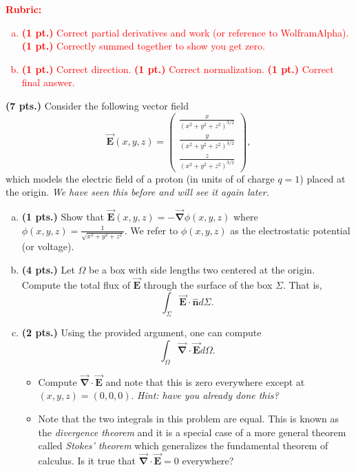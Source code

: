 \documentclass[12pt]{article} %
\newcommand{\grad}{\boldsymbol{\vec{\nabla}}}
\newcommand{\vecfieldE}{\boldsymbol{\vec{E}}}
\newcommand{\unitvec}{\boldsymbol{\hat{n}}}
\begin{document}
\vspace*{1cm}
\textcolor{red}{
\noindent \textbf{Rubric:}
\begin{enumerate}[(a)]
    \item \textbf{(1 pt.)} Correct partial derivatives and work (or reference to WolframAlpha). \textbf{(1 pt.)} Correctly summed together to show you get zero.
    \item \textbf{(1 pt.)} Correct direction. \textbf{(1 pt.)} Correct normalization. \textbf{(1 pt.)} Correct final answer.
\end{enumerate}
}



\newpage
\begin{problem}
\textbf{(7 pts.)} Consider the following vector field
\[
\vecfieldE(x,y,z) = \begin{pmatrix} \frac{x}{(x^2+y^2+z^2)^{3/2}} \\ \frac{y}{(x^2+y^2+z^2)^{3/2}} \\ \frac{z}{(x^2+y^2+z^2)^{3/2}} \end{pmatrix},
\]
which models the electric field of a proton (in units of of charge $q=1$) placed at the origin. \emph{We have seen this before and will see it again later.}
\begin{enumerate}[(a)]
	\item \textbf{(1 pts.)} Show that $\vecfieldE(x,y,z) = - \grad \phi(x,y,z)$ where $\phi(x,y,z) = \frac{1}{\sqrt{x^2+y^2+z^2}}$.  We refer to $\phi(x,y,z)$ as the electrostatic potential (or voltage).
	\item \textbf{(4 pts.)} Let $\Omega$ be a box with side lengths two centered at the origin.  Compute the total flux of $\vecfieldE$ through the surface of the box $\Sigma$. That is,
	\[
	\int_\Sigma \vecfieldE \cdot \unitvec d\Sigma.
	\]
	\item \textbf{(2 pts.)} Using the provided argument, one can compute
	\[
	\int_\Omega \grad \cdot \vecfieldE d\Omega.
	\]
	\begin{itemize}
		\item Compute $\grad \cdot \vecfieldE$ and note that this is zero everywhere except at $(x,y,z)=(0,0,0)$. \emph{Hint: have you already done this?}
		\item Note that the two integrals in this problem are equal. This is known as the \emph{divergence theorem} and it is a special case of a more general theorem called \emph{Stokes' theorem} which generalizes the fundamental theorem of calculus. Is it true that $\grad \cdot \vecfieldE = 0$ everywhere?
	\end{itemize}
\end{enumerate}
\end{problem}
\end{document}
